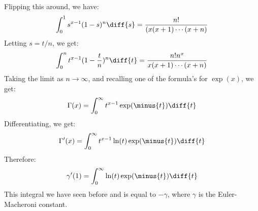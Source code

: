         Flipping this around, we have:
        \begin{equation}
            \int_{0}^{1}s^{x-1}(1-s)^{n}\diff{s}
            =\frac{n!}{(x(x+1)\cdots(x+n)}
        \end{equation}
        Letting $s=t/n$, we get:
        \begin{equation}
            \int_{0}^{n}t^{x-1}(1-\frac{t}{n})^{n}\diff{t}=
            \frac{n!n^{x}}{x(x+1)\cdots(x+n)}
        \end{equation}
        Taking the limit as $n\rightarrow\infty$, and recalling one of the formula's
        for $\exp(x)$, we get:
        \begin{equation}
            \Gamma(x)=\int_{0}^{\infty}t^{x-1}\exp(\minus{t})\diff{t}
        \end{equation}
        Differentiating, we get:
        \begin{equation}
            \Gamma'(x)=
            \int_{0}^{\infty}t^{x-1}\ln(t)\exp(\minus{t})\diff{t}
        \end{equation}
        Therefore:
        \begin{equation}
            \gamma'(1)=\int_{0}^{\infty}\ln(t)\exp(\minus{t})\diff{t}
        \end{equation}
        This integral we have seen before and is equal to $\minus\gamma$, where
        $\gamma$ is the Euler-Macheroni constant.
